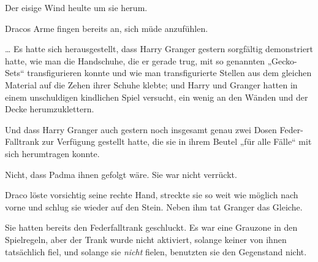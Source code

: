 \later

Der eisige Wind heulte um sie herum.

Dracos Arme fingen bereits an, sich müde anzufühlen.

… Es hatte sich herausgestellt, dass Harry Granger gestern sorgfältig demonstriert hatte, wie man die Handschuhe, die er gerade trug, mit so genannten „Gecko-Sets“ transfigurieren konnte und wie man transfigurierte Stellen aus dem gleichen Material auf die Zehen ihrer Schuhe klebte; und Harry und Granger hatten in einem unschuldigen kindlichen Spiel versucht, ein wenig an den Wänden und der Decke herumzuklettern.

Und dass Harry Granger auch gestern noch insgesamt genau zwei Dosen Feder-Falltrank zur Verfügung gestellt hatte, die sie in ihrem Beutel „für alle Fälle“ mit sich herumtragen konnte.

Nicht, dass Padma ihnen gefolgt wäre. Sie war nicht verrückt.

Draco löste vorsichtig seine rechte Hand, streckte sie so weit wie möglich nach vorne und schlug sie wieder auf den Stein. Neben ihm tat Granger das Gleiche.

Sie hatten bereits den Federfalltrank geschluckt. Es war eine Grauzone in den Spielregeln, aber der Trank wurde nicht aktiviert, solange keiner von ihnen tatsächlich fiel, und solange sie \emph{nicht} fielen, benutzten sie den Gegenstand nicht.


